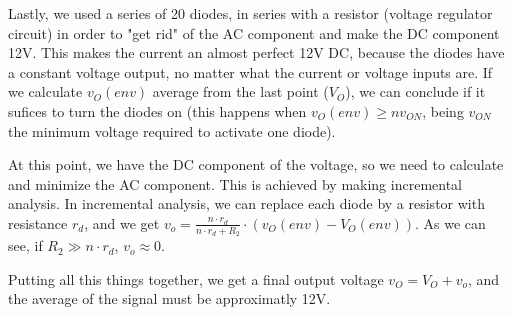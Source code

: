 
\par Lastly, we used a series of 20 diodes, in series with a resistor (voltage regulator circuit) in order to "get rid" of the AC component and make the DC component 12V. This makes the current an almost perfect 12V DC, because the diodes have a constant voltage output, no matter what the current or voltage inputs are. If we calculate $v_O(env)$ average from the last point ($V_O$), we can conclude if it sufices to turn the diodes on (this happens when $v_O(env) \geq nv_{ON}$, being $v_{ON}$ the minimum voltage required to activate one diode).
\par At this point, we have the DC component of the voltage, so we need to calculate and minimize the AC component. This is achieved by making incremental analysis. In incremental analysis, we can replace each diode by a resistor with resistance $r_d$, and we get $v_o = \frac{n \cdot r_d}{n \cdot r_d+R_2} \cdot (v_O(env)-V_O(env))$. As we can see, if $R_2 \gg n \cdot r_d$, $v_o \approx 0$.
\par Putting all this things together, we get a final output voltage $v_O=V_O+v_o$, and the average of the signal must be approximatly 12V.





	


